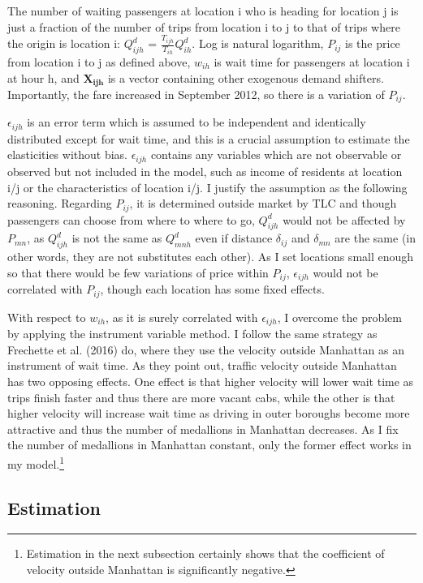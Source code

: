 \indent The number of waiting passengers at location i who is heading for location j is just a fraction of the number of trips from location i to j to that of trips where the origin is location i:   $Q^d_{ijh}$ = $\frac{T_{ijh}}{T_{ih}}Q^d_{ih}$. Log is natural logarithm, $P_{ij}$ is the price from location i to j as defined above, $w_{ih}$ is wait time for passengers at location i at hour h, and $\mathbf{X_{ijh}}$ is a vector containing other exogenous demand shifters. Importantly, the fare increased in September 2012, so there is a variation of $P_{ij}$.

$\epsilon_{ijh}$ is an error term which is assumed to be independent and identically distributed except for wait time, and this is a crucial assumption to estimate the elasticities without bias. $\epsilon_{ijh}$ contains any variables which are not observable or observed but not included in the model, such as income of residents at location i/j or the characteristics of location i/j. I justify the assumption as the following reasoning. Regarding $P_{ij}$, it is determined outside market by TLC and though passengers can choose from where to where to go, $Q^d_{ijh}$ would not be affected by $P_{mn}$, as $Q^d_{ijh}$ is not the same as $Q^d_{mnh}$ even if distance $\delta_{ij}$ and $\delta_{mn}$ are the same (in other words, they are not substitutes each other). As I set locations small enough so that there would be few variations of price within $P_{ij}$, $\epsilon_{ijh}$ would not be correlated with $P_{ij}$, though each location has some fixed effects.

With respect to $w_{ih}$, as it is surely correlated with $\epsilon_{ijh}$, I overcome the problem by applying the instrument variable method. I follow the same strategy as Frechette et al. (2016) do, where they use the velocity outside Manhattan as an instrument of wait time. As they point out, traffic velocity outside Manhattan has two opposing effects. One effect is that higher velocity will lower wait time as trips finish faster and thus there are more vacant cabs, while the other is that higher velocity will increase wait time as driving in outer boroughs become more attractive and thus the number of medallions in Manhattan decreases. As I fix the number of medallions in Manhattan constant, only the former effect works in my model.\footnote{Estimation in the next subsection certainly shows that the coefficient of velocity outside Manhattan is significantly negative.}


\vspace{0.5cm}
\subsection{Estimation}

